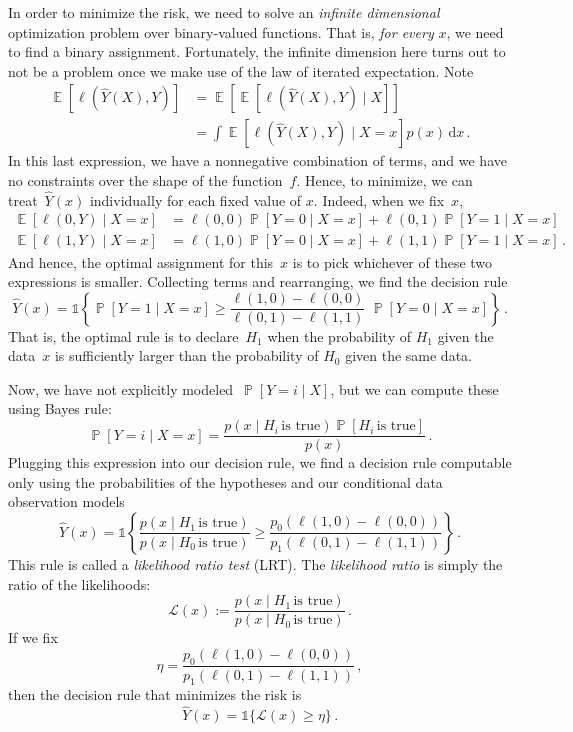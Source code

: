 \documentclass{tufte-book}
\begin{document}
In order to minimize the risk, we need to solve an \emph{infinite
dimensional} optimization problem over binary-valued functions. That is,
\emph{for every} \(x\), we need to find a binary assignment.
Fortunately, the infinite dimension here turns out to not be a problem
once we make use of the law of iterated expectation. Note \[
\begin{aligned}
    \mathop\mathbb{E}[\ell(\hat{Y}(X),Y)] &= \mathop\mathbb{E}\left[  \mathop\mathbb{E}\left[\ell(\hat{Y}(X),Y)\mid X\right] \right] \\
    &= \int \mathop\mathbb{E}[\ell(\hat{Y}(X),Y)\mid X=x] p(x) \,\mathrm{d} x\,.
\end{aligned}
\] In this last expression, we have a nonnegative combination of terms,
and we have no constraints over the shape of the function~\(f\). Hence,
to minimize, we can treat~\(\hat{Y}(x)\) individually for each fixed
value of \(x\). Indeed, when we fix~\(x\), \[
\begin{aligned}
\mathop\mathbb{E}[\ell(0,Y)\mid X=x]  &= \ell(0,0) \mathop\mathbb{P}[Y=0\mid X=x] + \ell(0,1) \mathop\mathbb{P}[Y=1\mid X=x]\\
\mathop\mathbb{E}[\ell(1,Y)\mid X=x]  &= \ell(1,0) \mathop\mathbb{P}[Y=0\mid X=x] + \ell(1,1) \mathop\mathbb{P}[Y=1\mid X=x]\,.
\end{aligned}
\] And hence, the optimal assignment for this~\(x\) is to pick whichever
of these two expressions is smaller. Collecting terms and rearranging,
we find the decision rule \[
\hat {Y}(x) = \mathbb{1}\left\{\mathop\mathbb{P}[Y=1\mid X=x] \geq  \frac{\ell(1,0)-\ell(0,0)}{\ell(0,1)-\ell(1,1)} \,\, \mathop\mathbb{P}[Y=0\mid X=x]\right\}\,.
\] That is, the optimal rule is to declare~\(H_1\) when the probability
of \(H_1\) given the data~\(x\) is sufficiently larger than the
probability of \(H_0\) given the same data.

Now, we have not explicitly modeled~\(\mathop\mathbb{P}[Y=i\mid X]\),
but we can compute these using Bayes rule: \[
    \mathop\mathbb{P}[Y=i\mid X=x] = \frac{p(x\mid H_i\,\text{is true}) \mathop\mathbb{P}[H_i\,\text{is true}]}{p(x)}\,.
\] Plugging this expression into our decision rule, we find a decision
rule computable only using the probabilities of the hypotheses and our
conditional data observation models \[
\hat {Y}(x) = \mathbb{1}\left\{
    \frac{p(x\mid H_1\,\text{is true})}{p(x\mid H_0\,\text{is true})} \geq  \frac{p_0(\ell(1,0)-\ell(0,0))}{p_1(\ell(0,1)-\ell(1,1))}\right\}\,.
\] This rule is called a \emph{likelihood ratio test} (LRT). The
\emph{likelihood ratio} is simply the ratio of the
likelihoods: \[
    \mathcal{L}(x) := \frac{p(x\mid H_1\,\text{is true})}{p(x\mid H_0\,\text{is true})}\,.
\] If we fix \[
\eta =  \frac{p_0(\ell(1,0)-\ell(0,0))}{p_1(\ell(0,1)-\ell(1,1))}\,,
\] then the decision rule that minimizes the risk is \[
    \hat{Y}(x) = \mathbb{1}\{ \mathcal{L}(x)\geq \eta \}\,.
\]
\end{document}
